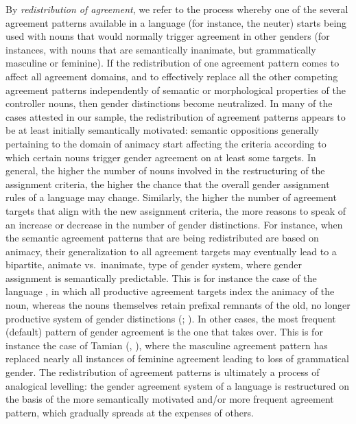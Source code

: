 \documentclass[output=collectionpaper]{langsci/langscibook}
\begin{document}
\largerpage[-2]
By \textit{redistribution of agreement}, we refer to the process whereby one of the several agreement patterns available in a language (for instance, the neuter) starts being used with nouns that would normally trigger agreement in other genders (for instances, with nouns that are semantically inanimate, but grammatically masculine or feminine). If the redistribution of one agreement pattern comes to affect all agreement domains, and to effectively replace all the other competing agreement patterns independently of semantic or morphological properties of the controller nouns, then gender distinctions become neutralized. In many of the cases attested in our sample, the redistribution of agreement patterns appears to be at least initially semantically motivated: semantic oppositions generally pertaining to the domain of animacy start affecting the criteria according to which certain nouns trigger gender agreement on at least some targets. In general, the higher the number of nouns involved in the restructuring of the assignment criteria, the higher the chance that the overall gender assignment rules of a language may change. Similarly, the higher the number of agreement targets that align with the new assignment criteria, the more reasons to speak of an increase or decrease in the number of gender distinctions. 
For instance, when the semantic agreement patterns that are being redistributed are based on animacy, their generalization to all agreement targets may eventually lead to a bipartite, animate vs.\ inanimate, type of gender system, where gender assignment is semantically predictable. This is for instance the case of the  language , in which all productive agreement targets index the animacy of the noun, whereas the nouns themselves retain prefixal remnants of the old, no longer productive system of gender distinctions (\citealt[130--132]{Maho1999}; \citealt[28--29]{Meeuwis2013}).  
In other cases, the most frequent (default) pattern of gender agreement is the one that takes over. This is for instance the case of Tamian  (, ), where the masculine agreement pattern has replaced nearly all instances of feminine agreement leading to loss of grammatical gender. The redistribution of agreement patterns is ultimately a process of analogical levelling: the gender agreement system of a language is restructured on the basis of the more semantically motivated and/or more frequent agreement pattern, which gradually spreads at the expenses of others.
\end{document}
